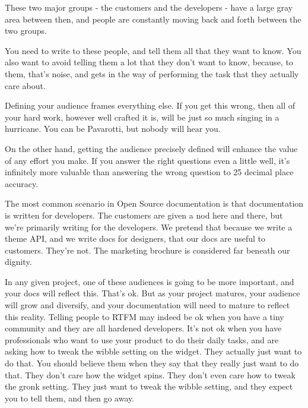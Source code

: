 These two major groups - the customers and the developers - have a large
gray area between then, and people are constantly moving back and forth
between the two groups.

You need to write to these people, and tell them all that they want to
know. You also want to avoid telling them a lot that they don't want to
know, because, to them, that's noise, and gets in the way of performing
the task that they actually care about.

Defining your audience frames everything else. If you get this wrong,
then all of your hard work, however well crafted it is, will be just so
much singing in a hurricane. You can be Pavarotti, but nobody will hear
you.

On the other hand, getting the audience precisely defined will enhance
the value of any effort you make. If you answer the right questions even
a little well, it's infinitely more valuable than answering the wrong
question to 25 decimal place accuracy.

The most common scenario in Open Source documentation is that
documentation is written for developers. The customers are given a nod
here and there, but we're primarily writing for the developers. We
pretend that because we write a theme API, and we write docs for
designers, that our docs are useful to customers. They're not. The
marketing brochure is considered far beneath our dignity.

In any given project, one of these audiences is going to be more
important, and your docs will reflect this. That's ok. But as your
project matures, your audience will grow and diversify, and your
documentation will need to mature to reflect this reality. Telling
people to RTFM may indeed be ok when you have a tiny community and they
are all hardened developers. It's not ok when you have professionals who
want to use your product to do their daily tasks, and are asking how to
tweak the wibble setting on the widget. They actually just want to do
that. You should believe them when they say that they really just want
to do that. They don't care how the widget spins. They don't even care
how to tweak the gronk setting. They just want to tweak the wibble
setting, and they expect you to tell them, and then go away.



